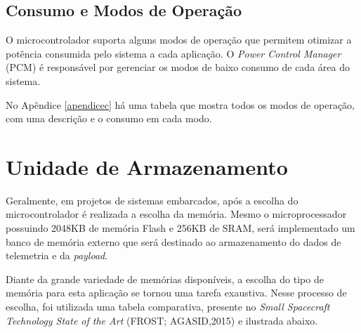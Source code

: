 \subsection{Consumo e Modos de Operação}

O microcontrolador suporta alguns modos de operação que permitem otimizar a potência consumida pelo sistema a cada aplicação. O \textit{Power Control Manager} (PCM) é responsável por gerenciar os modos de baixo consumo de cada área do sistema. 

No Apêndice \ref{apendicec} há uma tabela que mostra todos os modos de operação, com uma descrição e o consumo em cada modo.

\section{Unidade de Armazenamento}

Geralmente, em projetos de sistemas embarcados, após a escolha do microcontrolador é realizada a escolha da memória. Mesmo o microprocessador possuindo 2048KB de memória Flash e 256KB de SRAM, será implementado um banco de memória externo que será destinado ao armazenamento do dados de telemetria e da \textit{payload}.

Diante da grande variedade de memórias disponíveis, a escolha do tipo de memória para esta aplicação se tornou uma tarefa exaustiva. Nesse processo de escolha, foi utilizada uma tabela comparativa, presente no \textit{Small Spacecraft Technology State of the Art} (FROST; AGASID,2015) e ilustrada abaixo.


